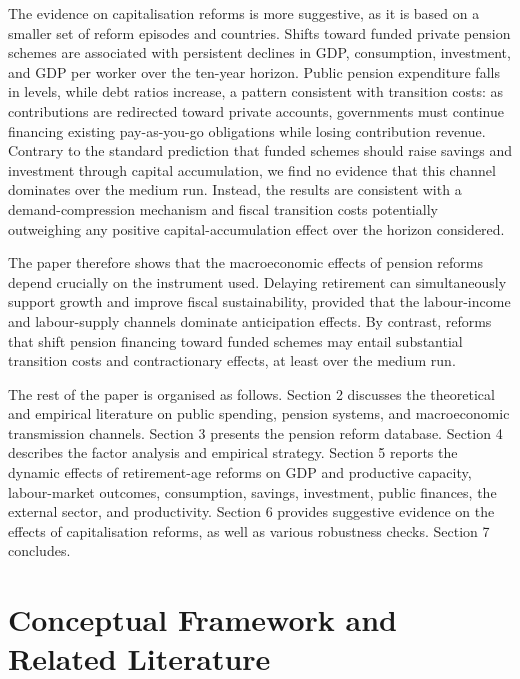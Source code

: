 \documentclass[11pt,english,a4paper, twoside, authoryear]{article}
\begin{document}
The evidence on capitalisation reforms is more suggestive, as it is based on a smaller set of reform episodes and countries. Shifts toward funded private pension schemes are associated with persistent declines in GDP, consumption, investment, and GDP per worker over the ten-year horizon. Public pension expenditure falls in levels, while debt ratios increase, a pattern consistent with transition costs: as contributions are redirected toward private accounts, governments must continue financing existing pay-as-you-go obligations while losing contribution revenue. Contrary to the standard prediction that funded schemes should raise savings and investment through capital accumulation, we find no evidence that this channel dominates over the medium run. Instead, the results are consistent with a demand-compression mechanism and fiscal transition costs potentially outweighing any positive capital-accumulation effect over the horizon considered.

The paper therefore shows that the macroeconomic effects of pension reforms depend crucially on the instrument used. Delaying retirement can simultaneously support growth and improve fiscal sustainability, provided that the labour-income and labour-supply channels dominate anticipation effects. By contrast, reforms that shift pension financing toward funded schemes may entail substantial transition costs and contractionary effects, at least over the medium run. 

The rest of the paper is organised as follows. Section 2 discusses the theoretical and empirical literature on public spending, pension systems, and macroeconomic transmission channels. Section 3 presents the pension reform database. Section 4 describes the factor analysis and empirical strategy. Section 5 reports the dynamic effects of retirement-age reforms on GDP and productive capacity, labour-market outcomes, consumption, savings, investment, public finances, the external sector, and productivity. Section 6 provides suggestive evidence on the effects of capitalisation reforms, as well as various robustness checks. Section 7 concludes.


\section{Conceptual Framework and Related Literature}
\end{document}
